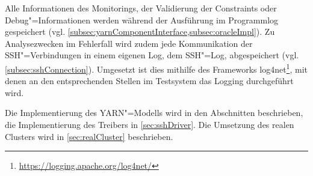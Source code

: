 Alle Informationen des Monitorings, der Validierung der Constraints oder Debug"=Informationen werden während der Ausführung im Programmlog gespeichert (vgl. \cref{subsec:yarnComponentInterface,subsec:oracleImpl}).
Zu Analysezwecken im Fehlerfall wird zudem jede Kommunikation der SSH"=Verbindungen in einem eigenen Log, dem SSH"=Log, abgespeichert (vgl. \cref{subsec:sshConnection}).
Umgesetzt ist dies mithilfe des Frameworks log4net\footnote{\url{https://logging.apache.org/log4net/}}, mit denen an den entsprechenden Stellen im Testsystem das Logging durchgeführt wird.

Die Implementierung des YARN"=Modells wird in den Abschnitten  beschrieben, die Implementierung des Treibers in \cref{sec:sshDriver}.
Die Umsetzung des realen Clusters wird in \cref{sec:realCluster} beschrieben.
